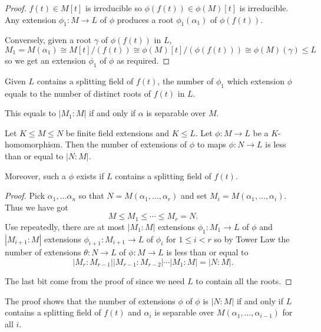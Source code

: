 \documentclass[a4paper]{article}
\begin{document}
\begin{proof}
  \(f(t) \in M[t]\) is irreducible so \(\phi(f(t)) \in \phi(M)[t]\) is irreducible. Any extension \(\phi_1: M \to L\) of \(\phi\) produces a root \(\phi_1(\alpha_1)\) of \(\phi(f(t))\).

  Conversely, given a root \(\gamma\) of \(\phi(f(t))\) in \(L\),
  \[
    M_1 = M(\alpha_1) \cong M[t]/(f(t)) \cong \phi(M)[t]/(\phi(f(t))) \cong \phi(M)(\gamma) \leq L
  \]
  so we get an extension \(\phi_1\) of \(\phi\) as required.
\end{proof}

\begin{corollary}
  Given \(L\) contains a splitting field of \(f(t)\), the number of \(\phi_1\) which extension \(\phi\) equals to the number of distinct roots of \(f(t)\) in \(L\).

  This equals to \(|M_1:M|\) if and only if \(\alpha\) is separable over \(M\).
\end{corollary}

\begin{corollary}
  \label{cor:homomorphic extension of finite extension}
  Let \(K \leq M \leq N\) be finite field extensions and \(K \leq L\). Let \(\phi: M \to L\) be a \(K\)-homomorphism. Then the number of extensions of \(\phi\) to maps \(\phi: N \to L\) is less than or equal to \(|N:M|\).

  Moreover, such a \(\phi\) exists if \(L\) contains a splitting field of \(f(t)\).
\end{corollary}

\begin{proof}
  Pick \(\alpha_1, \dots \alpha_n\) so that \(N = M(\alpha_1, \dots, \alpha_r)\) and set \(M_i = M(\alpha_1, \dots, \alpha_i)\). Thus we have got
  \[
    M \leq M_1 \leq \cdots \leq M_r = N.
  \]
  Use  repeatedly, there are at most \(|M_1:M|\) extensions \(\phi_1: M_1 \to L\) of \(\phi\) and \(|M_{i + 1}:M|\) extensions \(\phi_{i + 1}: M_{i + 1} \to L\) of \(\phi_i\) for \(1 \leq i < r\) so by Tower Law the number of extensions \(\theta: N \to L\) of \(\phi: M \to L\) is less than or equal to
  \[
    |M_r:M_{r - 1}||M_{r - 1}:M_{r - 2}|\cdots|M_1:M| = |N:M|.
  \]

  The last bit come from the proof of  since we need \(L\) to contain all the roots.
\end{proof}

\begin{remark}
  The proof shows that the number of extensions \(\phi\) of \(\phi\) is \(|N:M|\) if and only if \(L\) contains a splitting field of \(f(t)\) and \(\alpha_i\) is separable over \(M(\alpha_1, \dots, \alpha_{i - 1})\) for all \(i\).
\end{remark}
\end{document}
